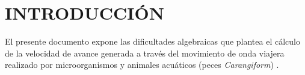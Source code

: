 \section{INTRODUCCIÓN} \label{sec:Introduccion}
El presente documento expone las dificultades algebraicas que plantea el cálculo de la velocidad de avance generada a través del movimiento de onda viajera realizado por microorganismos \cite{} y animales acuáticos (peces \textit{Carangiform}) \cite{}.

